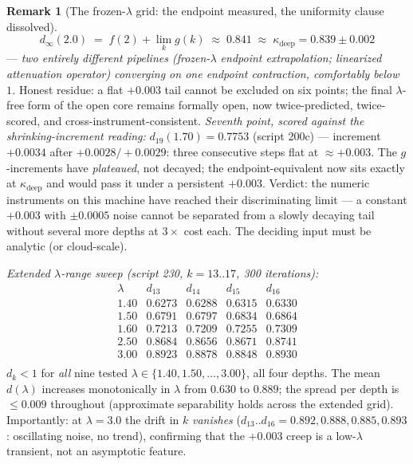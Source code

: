 \documentclass[11pt]{article}
\theoremstyle{definition}
\newtheorem{remark}[theorem]{Remark}
\newcommand{\lam}{\lambda}
\begin{document}
\begin{remark}[The frozen-$\lam$ grid: the endpoint measured, the
uniformity clause dissolved]
\[
d_\infty(2.0) \;=\; f(2) + \lim_k g(k) \;\approx\; 0.841
\;\approx\; \kappa_{\mathrm{deep}} = 0.839 \pm 0.002
\]
--- \emph{two entirely different pipelines (frozen-$\lam$ endpoint
extrapolation; linearized attenuation operator) converging on one
endpoint contraction, comfortably below $1$.} Honest residue: a flat
$+0.003$ tail cannot be excluded on six points; the final $\lam$-free
form of the open core remains formally open, now twice-predicted,
twice-scored, and cross-instrument-consistent.
\emph{Seventh point, scored against the shrinking-increment reading:}
$d_{19}(1.70) = 0.7753$ (script 200c) --- increment $+0.0034$ after
$+0.0028/+0.0029$: three consecutive steps flat at $\approx +0.003$.
The $g$-increments have \emph{plateaued}, not decayed; the
endpoint-equivalent now sits exactly at $\kappa_{\mathrm{deep}}$ and
would pass it under a persistent $+0.003$. Verdict: the numeric
instruments on this machine have reached their discriminating limit
--- a constant $+0.003$ with $\pm 0.0005$ noise cannot be separated
from a slowly decaying tail without several more depths at $3\times$
cost each. The deciding input must be analytic (or cloud-scale).

\emph{Extended $\lam$-range sweep (script 230, $k = 13..17$, 300 iterations):}
\[
\begin{array}{lcccc}
\lam & d_{13} & d_{14} & d_{15} & d_{16} \\
1.40 & 0.6273 & 0.6288 & 0.6315 & 0.6330 \\
1.50 & 0.6791 & 0.6797 & 0.6834 & 0.6864 \\
1.60 & 0.7213 & 0.7209 & 0.7255 & 0.7309 \\
2.50 & 0.8684 & 0.8656 & 0.8671 & 0.8741 \\
3.00 & 0.8923 & 0.8878 & 0.8848 & 0.8930 \\
\end{array}
\]
$d_k < 1$ for \emph{all} nine tested $\lam \in \{1.40, 1.50, \ldots, 3.00\}$, all four depths.
The mean $d(\lam)$ increases monotonically in $\lam$ from $0.630$ to $0.889$; the
spread per depth is $\le 0.009$ throughout (approximate separability holds across the
extended grid). Importantly: at $\lam = 3.0$ the drift in $k$ \emph{vanishes}
($d_{13}..d_{16} = 0.892, 0.888, 0.885, 0.893$: oscillating noise, no trend), confirming
that the $+0.003$ creep is a low-$\lam$ transient, not an asymptotic feature.


\end{remark}
\end{document}
